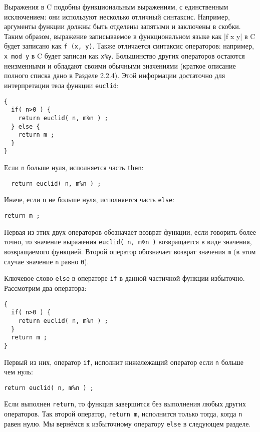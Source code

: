Выражения в C подобны функциональным выражениям, с единственным исключением: они используют несколько отличный синтаксис. Например, аргументы функции должны быть отделены запятыми и заключены в скобки. Таким образом, выражение записываемое в функциональном языке как \inline|f x y| в C будет записано как \lstinline|f (x, y)|. Также отличается синтаксис операторов: например, \lstinline|x mod y| в C будет записан как \lstinline|x%y|. Большинство других операторов остаются неизменными и обладают своими обычными значениями (краткое описание полного списка дано в Разделе 2.2.4). Этой информации достаточно для интерпретации тела функции \lstinline|euclid|:

\begin{lstlisting}
{
  if( n>0 ) {
    return euclid( n, m%n ) ;
  } else {
    return m ;
  }
}
\end{lstlisting}

Если \lstinline|n| больше нуля, исполняется часть \lstinline|then|:

\begin{lstlisting}
  return euclid( n, m%n ) ;
\end{lstlisting}

Иначе, если \lstinline|n| не больше нуля, исполняется часть \lstinline|else|:

\begin{lstlisting}
return m ;
\end{lstlisting}

Первая из этих двух операторов обозначает возврат функции, если говорить более точно, то значение выражения \lstinline|euclid( n, m%n )| возвращается в виде значения, возвращаемого функцией. Второй оператор обозначает возврат значения \lstinline|m| (в этом случае значение \lstinline|n| равно \lstinline|0|).

Ключевое слово \lstinline|else| в операторе \lstinline|if| в данной частичной функции избыточно. Рассмотрим два оператора:

\begin{lstlisting}
{
  if( n>0 ) {
    return euclid( n, m%n ) ;
  }
  return m ;
}
\end{lstlisting}

Первый из них, оператор \lstinline|if|, исполнит нижележащий оператор если \lstinline|n| больше чем нуль:

\begin{lstlisting}
return euclid( n, m%n ) ;
\end{lstlisting}

Если выполнен \lstinline|return|, то функция завершится без выполнения любых других операторов. Так второй оператор, \lstinline|return m|, исполнится только тогда, когда \lstinline|n| равен нулю. Мы вернёмся к избыточному оператору \lstinline|else| в следующем разделе.

